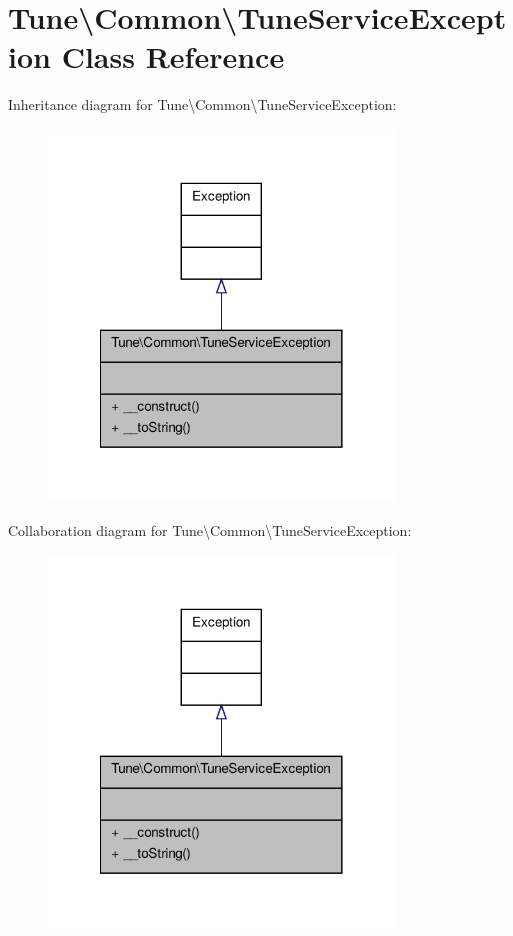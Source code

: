 \hypertarget{classTune_1_1Common_1_1TuneServiceException}{\section{Tune\textbackslash{}Common\textbackslash{}Tune\-Service\-Exception Class Reference}
\label{classTune_1_1Common_1_1TuneServiceException}
}


Inheritance diagram for Tune\textbackslash{}Common\textbackslash{}Tune\-Service\-Exception\-:
\nopagebreak
\begin{figure}[H]
\begin{center}
\leavevmode
\includegraphics[width=260pt]{classTune_1_1Common_1_1TuneServiceException__inherit__graph}
\end{center}
\end{figure}


Collaboration diagram for Tune\textbackslash{}Common\textbackslash{}Tune\-Service\-Exception\-:
\nopagebreak
\begin{figure}[H]
\begin{center}
\leavevmode
\includegraphics[width=260pt]{classTune_1_1Common_1_1TuneServiceException__coll__graph}
\end{center}
\end{figure}

